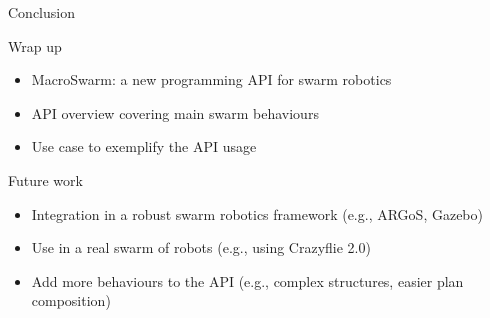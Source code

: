 \documentclass[presentation, 9pt]{beamer}\mode<presentation>{\usetheme{AMSBolognaFC}}
\begin{document}
\begin{frame}{Conclusion}
	\begin{exampleblock}{Wrap up}
		\begin{itemize}
			\item MacroSwarm: a new programming API for swarm robotics
			\item API overview covering main swarm behaviours
			\item Use case to exemplify the API usage
		\end{itemize}
	\end{exampleblock}
	
	\begin{alertblock}{Future work}
		\begin{itemize}
			\item Integration in a robust swarm robotics framework (e.g., ARGoS, Gazebo)
			\item Use in a real swarm of robots (e.g., using Crazyflie 2.0)
			\item Add more behaviours to the API (e.g., complex structures, easier plan composition)
		\end{itemize}
	\end{alertblock}
\end{frame}
\end{document}
